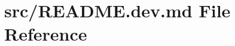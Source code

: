\hypertarget{README_8dev_8md}{}\section{src/\+R\+E\+A\+D\+ME.dev.\+md File Reference}
\label{README_8dev_8md}

